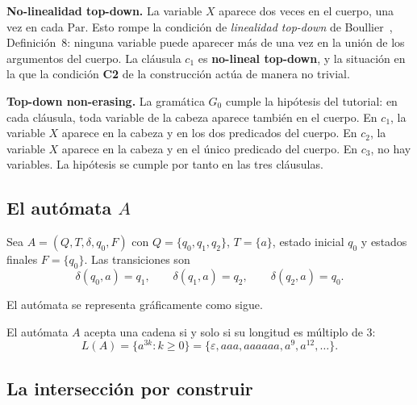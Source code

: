 \documentclass[11pt, letterpaper]{article}
\theoremstyle{definition}
\newcommand{\eps}{\varepsilon}
\newcommand{\trans}{\delta}
\newcommand{\hl}[1]{\textcolor{red!70!black}{\textbf{#1}}}
\newcommand{\Par}{\mathrm{Par}}
\begin{document}
\textbf{No-linealidad top-down.} La variable $X$ aparece dos veces en el cuerpo, una vez en cada $\Par$. Esto rompe la condición de \emph{linealidad top-down} de Boullier~\cite{REF}, Definición~8: ninguna variable puede aparecer más de una vez en la unión de los argumentos del cuerpo. La cláusula $c_1$ es \hl{no-lineal top-down}, y la situación en la que la condición \textbf{C2} de la construcción actúa de manera no trivial.

\textbf{Top-down non-erasing.} La gramática $G_0$ cumple la hipótesis del tutorial: en cada cláusula, toda variable de la cabeza aparece también en el cuerpo. En $c_1$, la variable $X$ aparece en la cabeza y en los dos predicados del cuerpo. En $c_2$, la variable $X$ aparece en la cabeza y en el único predicado del cuerpo. En $c_3$, no hay variables. La hipótesis se cumple por tanto en las tres cláusulas.

\subsection{El autómata $A$}

Sea $A = (Q, T, \trans, q_0, F)$ con $Q = \{q_0, q_1, q_2\}$, $T = \{a\}$, estado inicial $q_0$ y estados finales $F = \{q_0\}$. Las transiciones son
\[
\trans(q_0, a) = q_1, \qquad \trans(q_1, a) = q_2, \qquad \trans(q_2, a) = q_0.
\]

El autómata se representa gráficamente como sigue.

\begin{center}
\end{center}

El autómata $A$ acepta una cadena si y solo si su longitud es múltiplo de 3:
\[
L(A) = \{ a^{3k} : k \geq 0 \} = \{\eps, aaa, aaaaaa, a^9, a^{12}, \ldots\}.
\]

\subsection{La intersección por construir}
\end{document}
